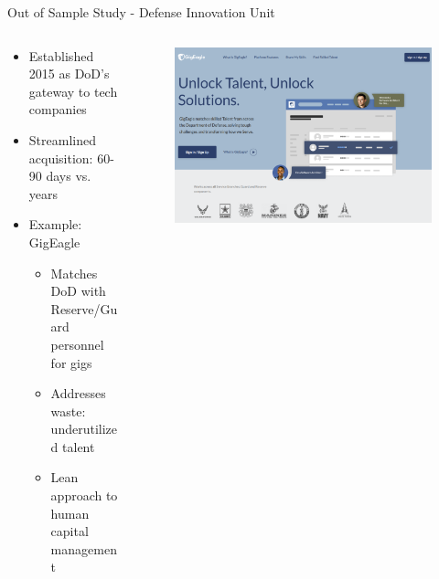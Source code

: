 \documentclass[aspectratio=169,11pt,xcolor={dvipsnames},hyperref={pdftex,pdfpagemode=UseNone,hidelinks,pdfdisplaydoctitle=true},usepdftitle=false]{beamer}
\begin{document}
    \begin{frame}{Out of Sample Study - Defense Innovation Unit}
      \begin{columns}
        \begin{column}{0.48\textwidth}
          \setlength{\itemsep}{0pt}
          \setlength{\parskip}{0pt}
          \begin{itemize}
            \item Established 2015 as DoD's gateway to tech companies
            \item Streamlined acquisition: 60-90 days vs. years
            \item Example: GigEagle
              \setlength{\itemsep}{0pt}
              \setlength{\parskip}{0pt}
              \begin{itemize}
                \item Matches DoD with Reserve/Guard personnel for gigs
                \item Addresses waste: underutilized talent
                \item Lean approach to human capital management
              \end{itemize}
          \end{itemize}
        \end{column}
        
          
          \begin{column}{0.48\textwidth}
            \begin{figure}
                  \centering
                  \includegraphics[width=\linewidth]{figures/gigeagle.pdf}
                \end{figure}
          \end{column}
        \end{columns}
      \end{frame}
\end{document}
